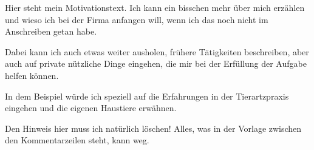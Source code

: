 \documentclass[fontsize=12pt,parskip=half-]{scrartcl}
\begin{document}
\begin{Motivation}
    Hier steht mein Motivationstext. Ich kann ein bisschen mehr
    über mich erzählen und wieso ich bei der Firma anfangen will,
    wenn ich das noch nicht im Anschreiben getan habe.
    
    Dabei kann ich auch etwas weiter ausholen, frühere Tätigkeiten
    beschreiben, aber auch auf private nützliche Dinge eingehen,
    die mir bei der Erfüllung der Aufgabe helfen können.
    
    In dem Beispiel würde ich speziell auf die Erfahrungen in der
    Tierartzpraxis eingehen und die eigenen Haustiere erwähnen.
    
    Den Hinweis hier muss ich natürlich löschen! Alles, was in der Vorlage
    zwischen den Kommentarzeilen steht, kann weg.
\end{Motivation}



\begin{Anlagenverzeichnis}
    \begin{Auflistung}
    \end{Auflistung}

    \begin{Auflistung}
    \end{Auflistung}
\end{Anlagenverzeichnis}


\end{document}
